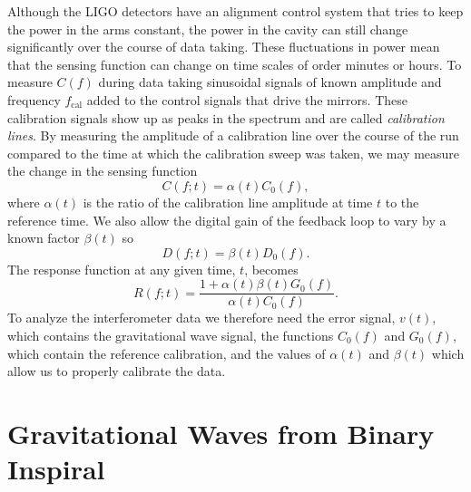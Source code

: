 Although the LIGO detectors have an alignment control system that tries to
keep the power in the arms constant, the power in the cavity can still change
significantly over the course of data taking. These fluctuations in power mean
that the sensing function can change on time scales of order minutes or hours.
To measure $C(f)$ during data taking sinusoidal signals of known amplitude and
frequency $f_\mathrm{cal}$ added to the control signals that drive the
mirrors. These calibration signals show up as peaks in the spectrum and are
called \emph{calibration lines}. By measuring the amplitude of a calibration
line  over the course of the run compared to the time at which the calibration
sweep was taken, we may measure the change in the sensing function
\begin{equation}
C(f;t) = \alpha(t) C_0(f),
\end{equation}
where $\alpha(t)$ is the ratio of the calibration line amplitude at time $t$
to the reference time. We also allow the digital gain of the feedback loop to
vary by a known factor $\beta(t)$ so 
\begin{equation}
D(f;t) = \beta(t) D_0(f).
\end{equation}
The response function at any given time, $t$, becomes
\begin{equation}
R(f;t) = \frac{1 + \alpha(t)\beta(t)G_0(f)}{\alpha(t)C_0(f)}.
\label{eq:calibration}
\end{equation}
To analyze the interferometer data we therefore need the error signal, $v(t)$,
which contains the gravitational wave signal, the functions $C_0(f)$ and
$G_0(f)$, which contain the reference calibration, and the values of
$\alpha(t)$ and $\beta(t)$ which allow us to properly calibrate the data.

\section{Gravitational Waves from Binary Inspiral}
\label{s:inspiralgw}


